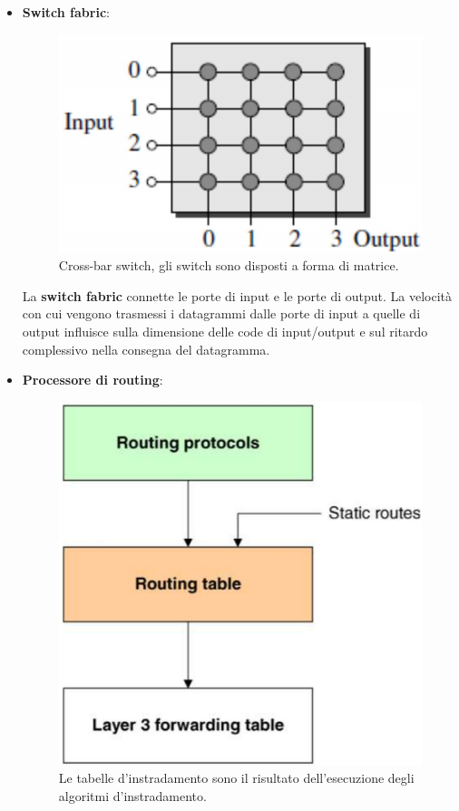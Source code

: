 \documentclass[11pt,a4paper,oneside]{book}
\theoremstyle{definition}
\begin{document}
\begin{itemize}
	\item \textbf{Switch fabric}:

	      \begin{figure}[!h]
		      \includegraphics[scale=0.25]{Immagini/Switch_f.png}
		      \centering
		      \caption{Cross-bar switch, gli switch sono disposti a forma di matrice.}
	      \end{figure}

	      La \textbf{switch fabric} connette le porte di input e le porte di output. La velocità con cui vengono trasmessi i datagrammi  dalle porte di input a quelle di output influisce sulla dimensione delle code di input/output e sul ritardo complessivo nella consegna del datagramma.

	\item \textbf{Processore di routing}:

	      \begin{figure}[!h]
		      \includegraphics[scale=0.25]{Immagini/Rout_tab.png}
		      \centering
		      \caption{Le tabelle d'instradamento sono il risultato dell'esecuzione degli algoritmi d'instradamento.}
	      \end{figure}


\end{itemize}
\end{document}
